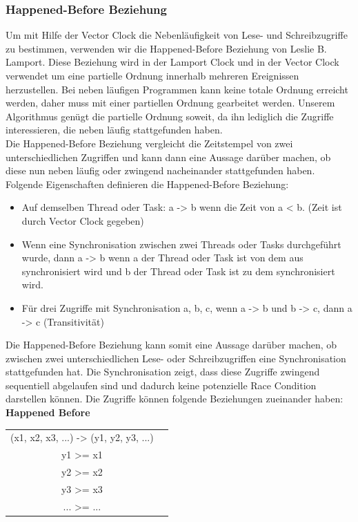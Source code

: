 \documentclass[10pt,a4paper]{article}
\begin{document}
\subsubsection{Happened-Before Beziehung}
\begin{flushleft}
Um mit Hilfe der Vector Clock die Nebenläufigkeit von Lese- und Schreibzugriffe zu bestimmen, verwenden wir die Happened-Before Beziehung von Leslie B. Lamport. Diese Beziehung wird in der Lamport Clock und in der Vector Clock verwendet um eine partielle Ordnung innerhalb mehreren Ereignissen herzustellen. Bei neben läufigen Programmen kann keine totale Ordnung erreicht werden, daher muss mit einer partiellen Ordnung gearbeitet werden. Unserem Algorithmus genügt die partielle Ordnung soweit, da ihn lediglich die Zugriffe interessieren, die neben läufig stattgefunden haben. \\
Die Happened-Before Beziehung vergleicht die Zeitstempel von zwei unterschiedlichen Zugriffen und kann dann eine Aussage darüber machen, ob diese nun neben läufig oder zwingend nacheinander stattgefunden haben. Folgende Eigenschaften definieren die Happened-Before Beziehung:
\begin{itemize}
\item Auf demselben Thread oder Task: a -> b wenn die Zeit von a < b. (Zeit ist durch Vector Clock gegeben)
\item Wenn eine Synchronisation zwischen zwei Threads oder Tasks durchgeführt wurde, dann a -> b wenn a der Thread oder Task ist von dem aus synchronisiert wird und b der Thread oder Task ist zu dem synchronisiert wird.
\item Für drei Zugriffe mit Synchronisation a, b, c, wenn a -> b und b -> c, dann a -> c (Transitivität)
\end{itemize}
Die Happened-Before Beziehung kann somit eine Aussage darüber machen, ob zwischen zwei unterschiedlichen Lese- oder Schreibzugriffen eine Synchronisation stattgefunden hat. Die Synchronisation zeigt, dass diese Zugriffe zwingend sequentiell abgelaufen sind und dadurch keine potenzielle Race Condition darstellen können. Die Zugriffe können folgende Beziehungen zueinander haben:\\[0.5cm]
\textbf{ Happened Before}\\[0.2cm]
\end{flushleft}
\begin{center}
\begin{tabular}{ c c }
  (x1, x2, x3, ...) -> (y1, y2, y3, ...) \\
  y1 >= x1 \\
  y2 >= x2 \\
  y3 >= x3 \\
  ... >= ... \\[0.2cm]
\end{tabular}
\end{center}
\end{document}
